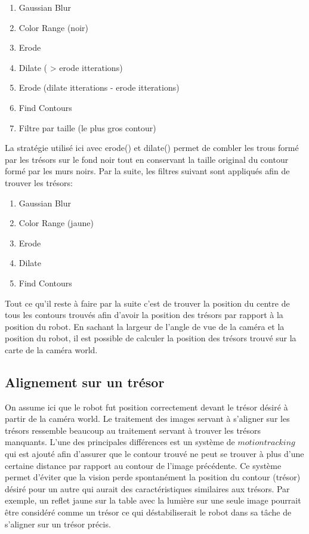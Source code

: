 \begin{enumerate}
\item Gaussian Blur
\item Color Range (noir)
\item Erode
\item Dilate ( > erode itterations)
\item Erode (dilate itterations - erode itterations)
\item Find Contours
\item Filtre par taille (le plus gros contour)
\end{enumerate}

La stratégie utilisé ici avec erode() et dilate() permet de combler les trous formé par les trésors sur le fond noir tout en conservant la taille original du contour formé par les murs noirs. Par la suite, les filtres suivant sont appliqués afin de trouver les trésors:

\begin{enumerate}
\item Gaussian Blur
\item Color Range (jaune)
\item Erode
\item Dilate 
\item Find Contours
\end{enumerate}

Tout ce qu'il reste à faire par la suite c'est de trouver la position du centre de tous les contours trouvés afin d'avoir la position des trésors par rapport à la position du robot. En sachant la largeur de l'angle de vue de la caméra et la position du robot, il est possible de calculer la position des trésors trouvé sur la carte de la caméra world.

\subsection{Alignement sur un trésor}

On assume ici que le robot fut position correctement devant le trésor désiré à partir de la caméra world. Le traitement des images servant à s'aligner sur les trésors ressemble beaucoup au traitement servant à trouver les trésors manquants.  L'une des principales différences est un système de $motion tracking$ qui est ajouté afin d'assurer que le contour trouvé ne peut se trouver à plus d'une certaine distance par rapport au contour de l'image précédente. Ce système permet d'éviter que la vision perde spontanément la position du contour (trésor) désiré pour un autre qui aurait des caractéristiques similaires aux trésors. Par exemple, un reflet jaune sur la table avec la lumière sur une seule image pourrait être considéré comme un trésor ce qui déstabiliserait le robot dans sa tâche de s'aligner sur un trésor précis.

